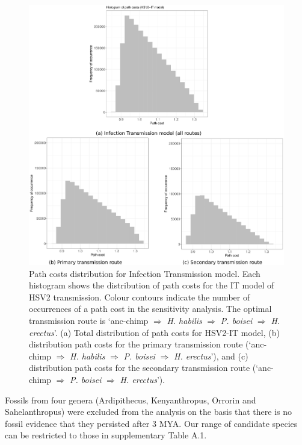 \documentclass[fleqn,10pt]{wlscirep}
\begin{document}
\begin{figure}
  \centering
  \includegraphics[width=\textwidth]{figs/gamma_path_costs}
  \caption{Path costs distribution for Infection Transmission model. Each histogram shows the distribution of path costs for the IT model of HSV2 transmission. Colour contours indicate the number of occurrences of a path cost in the sensitivity analysis. The optimal transmission route is ‘anc-chimp $\Rightarrow$ \textit{H. habilis} $\Rightarrow$ \textit{P. boisei} $\Rightarrow$ \textit{H. erectus}’. (a) Total distribution of path costs for HSV2-IT model, (b) distribution path costs for the primary transmission route (‘anc-chimp $\Rightarrow$ \textit{H. habilis} $\Rightarrow$ \textit{P. boisei} $\Rightarrow$ \textit{H. erectus}’), and (c) distribution path costs for the  secondary transmission route (‘anc-chimp $\Rightarrow$ \textit{P. boisei} $\Rightarrow$ \textit{H. erectus}’).}
  \label{fig:gamma}   
\end{figure}     



Fossils from four genera (Ardipithecus, Kenyanthropus, Orrorin and Sahelanthropus) were excluded from the analysis on the basis that there is no fossil evidence that they persisted after 3 MYA. Our range of candidate species can be restricted to those in supplementary Table A.1.
\end{document}
